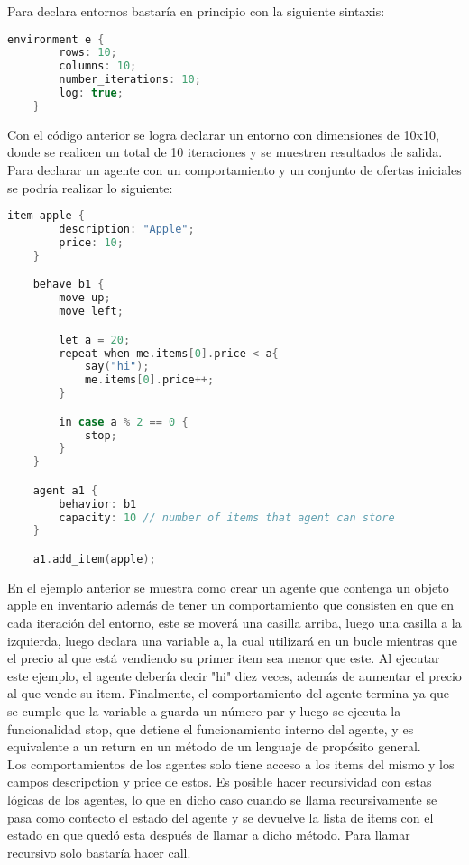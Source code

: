 \documentclass{article}
\begin{document}
Para declara entornos bastaría en principio con la siguiente sintaxis:\\

\begin{lstlisting}[language=c]
	environment e {
		rows: 10;
		columns: 10;
		number_iterations: 10;
		log: true;
	}
\end{lstlisting}

Con el código anterior se logra declarar un entorno con dimensiones de 10x10, donde se realicen un total de 10 iteraciones y se muestren resultados de salida. \\

Para declarar un agente con un comportamiento y un conjunto de ofertas iniciales se podría realizar lo siguiente:

\begin{lstlisting}[language=c]
	item apple {
		description: "Apple";
		price: 10;
	}	

	behave b1 {
		move up;
		move left;

		let a = 20;
		repeat when me.items[0].price < a{
			say("hi");
			me.items[0].price++;
		}

		in case a % 2 == 0 {
			stop;
		}
	}

	agent a1 {
		behavior: b1
		capacity: 10 // number of items that agent can store
	}

	a1.add_item(apple);

\end{lstlisting}

En el ejemplo anterior se muestra como crear un agente que contenga un objeto apple en inventario además de tener un comportamiento que consisten en que en cada iteración del entorno, este se moverá una casilla arriba, luego una casilla a la izquierda, luego declara una variable a, la cual utilizará en un bucle mientras que el precio al que está vendiendo su primer item sea menor que este. Al ejecutar este ejemplo, el agente debería decir "hi" diez veces, además de aumentar el precio al que vende su item. Finalmente, el comportamiento del agente termina ya que se cumple que la variable a guarda un número par y luego se ejecuta la funcionalidad stop, que detiene el funcionamiento interno del agente, y es equivalente a un return en un método de un lenguaje de propósito general.\\

Los comportamientos de los agentes solo tiene acceso a los items del mismo y los campos descripction y price de estos. Es posible hacer recursividad con estas lógicas de los agentes, lo que en dicho caso cuando se llama recursivamente se pasa como contecto el estado del agente y se devuelve la lista de items con el estado en que quedó esta después de llamar a dicho método. Para llamar recursivo solo bastaría hacer call.
\end{document}
